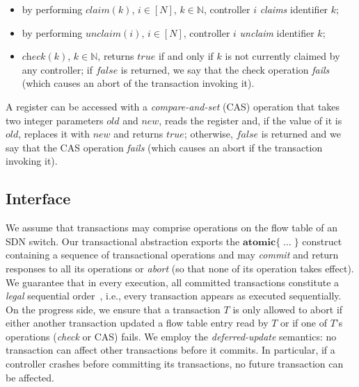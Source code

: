 \documentclass[conference]{sigcomm-alternate}
\newcommand{\Nat}{\mathbb{N}}
\begin{document}
\begin{itemize}
\item by performing $\textit{claim}(k)$, $i\in[N]$,
  $k\in\Nat$, controller $i$ \emph{claims} 
  identifier $k$;


\item by performing $\textit{unclaim}(i)$, $i\in[N]$, controller $i$
  \emph{unclaim} identifier $k$;  

\item $\textit{check}(k)$, $k\in\Nat$, returns $\textit{true}$ if and
  only if $k$ is not currently claimed by any controller; if
  $\textit{false}$ is returned, we say that the check operation
  \emph{fails} (which causes an abort of the transaction invoking it).

\end{itemize}  

A register can be accessed with a
\emph{compare-and-set} (CAS) operation that takes two integer parameters
$\textit{old}$ and $\textit{new}$, reads the register and, if the
value of it is $\textit{old}$, replaces it with $\textit{new}$ and
returns $\textit{true}$; otherwise, $\textit{false}$ is returned and
we say that the CAS operation \emph{fails} (which causes an abort if
the transaction invoking it).   

\subsection{Interface}\label{sec:t-if}

We assume that transactions may comprise operations on the flow table
of an SDN switch. Our transactional abstraction exports the
$\textbf{atomic}\{\;\ldots\;\}$ construct
containing a sequence of transactional
operations and may \emph{commit} and return responses to all its operations
or \emph{abort} (so that none of its operation takes effect).  
We guarantee that in every execution, all committed
transactions constitute a \emph{legal} sequential
order~\cite{Pap79-serial}, i.e., every transaction appears as executed
sequentially. On the progress side, we ensure that a
transaction $T$ is only allowed to abort if either another 
transaction updated a flow table entry read by $T$  
or if one of $T$'s operations (\textit{check} or CAS) fails.
We employ the \emph{deferred-update} semantics:  
no transaction can affect other transactions before it commits.
In particular, if a controller crashes before committing its
transactions, no future transaction can be affected.  
\end{document}
